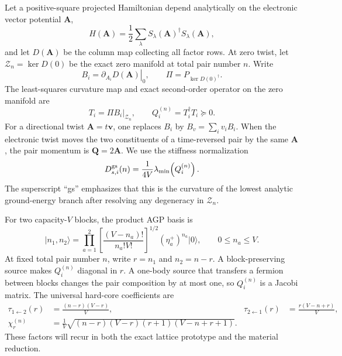\documentclass[11pt]{article}
\theoremstyle{remark}
\newcommand{\ket}[1]{\lvert #1\rangle}
\newcommand{\cZ}{\mathcal Z}
\newcommand{\bmA}{\bm A}
\newcommand{\bmQ}{\bm Q}
\begin{document}
Let a positive-square projected Hamiltonian depend analytically on the electronic vector potential $\bmA$,
\begin{equation}
H(\bmA)=\frac12\sum_\lambda S_\lambda(\bmA)^\dagger S_\lambda(\bmA),
\label{eq:positive-square-general}
\end{equation}
and let $D(\bmA)$ be the column map collecting all factor rows.  At zero twist, let $\cZ_n=\ker D(0)$ be the exact zero manifold at total pair number $n$.  Write
\begin{equation}
B_i=\left.\partial_{A_i}D(\bmA)\right|_{0},
\qquad
\Pi=P_{\ker D(0)^\dagger}.
\end{equation}
The least-squares curvature map and exact second-order operator on the zero manifold are
\begin{equation}
T_i=\Pi B_i\big|_{\cZ_n},
\qquad
Q_i^{(n)}=T_i^\dagger T_i\succeq0.
\label{eq:target-map}
\end{equation}
For a directional twist $\bmA=t\bm v$, one replaces $B_i$ by $B_v=\sum_i v_iB_i$.  When the electronic twist moves the two constituents of a time-reversed pair by the same $\bmA$, the pair momentum is $\bmQ=2\bmA$.  We use the stiffness normalization
\begin{equation}
D_{s,i}^{\rm gs}(n)=\frac{1}{4V}\lambda_{\min}\!\left(Q_i^{(n)}\right).
\label{eq:stiffness-normalization}
\end{equation}
The superscript ``gs'' emphasizes that this is the curvature of the lowest analytic ground-energy branch after resolving any degeneracy in $\cZ_n$.

For two capacity-$V$ blocks, the product AGP basis is
\begin{equation}
\ket{n_1,n_2}
=\prod_{a=1}^2
\left[\frac{(V-n_a)!}{n_a!V!}\right]^{1/2}
(\eta_a^+)^{n_a}\ket0,
\qquad 0\le n_a\le V.
\label{eq:product-agp-general}
\end{equation}
At fixed total pair number $n$, write $r=n_1$ and $n_2=n-r$.  A block-preserving source makes $Q_i^{(n)}$ diagonal in $r$.  A one-body source that transfers a fermion between blocks changes the pair composition by at most one, so $Q_i^{(n)}$ is a Jacobi matrix.  The universal hard-core coefficients are
\begin{align}
\tau_{1\leftarrow2}(r)&=\frac{(n-r)(V-r)}{V},
&
\tau_{2\leftarrow1}(r)&=\frac{r(V-n+r)}{V},
\label{eq:directed-transfer}\\
\chi_r^{(n)}&=\frac1V
\sqrt{(n-r)(V-r)(r+1)(V-n+r+1)}.
\label{eq:clebsch-transfer}
\end{align}
These factors will recur in both the exact lattice prototype and the material reduction.
\end{document}

